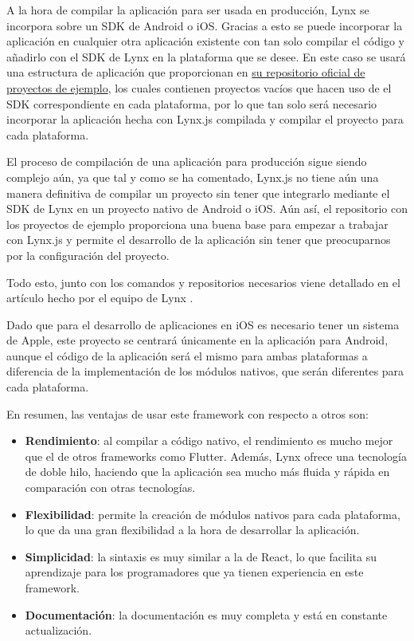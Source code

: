A la hora de compilar la aplicación para ser usada en producción, Lynx se incorpora sobre un SDK de Android o iOS. Gracias a esto se puede incorporar la aplicación en cualquier otra aplicación existente con tan solo compilar el código y añadirlo con el SDK de Lynx en la plataforma que se desee.
En este caso se usará una estructura de aplicación que proporcionan en \href{https://github.com/lynx-family/integrating-lynx-demo-projects}{su repositorio oficial de proyectos de ejemplo}, los cuales contienen proyectos vacíos que hacen uso de el SDK correspondiente en cada plataforma, por lo que tan solo será necesario incorporar la aplicación hecha con Lynx.js compilada y compilar el proyecto para cada plataforma.

El proceso de compilación de una aplicación para producción sigue siendo complejo aún, ya que tal y como se ha comentado, Lynx.js no tiene aún una manera definitiva de compilar un proyecto sin tener que integrarlo mediante el SDK de Lynx en un proyecto nativo de Android o iOS. Aún así, el repositorio con los proyectos de ejemplo proporciona una buena base para empezar a trabajar con Lynx.js y permite el desarrollo de la aplicación sin tener que preocuparnos por la configuración del proyecto.

Todo esto, junto con los comandos y repositorios necesarios viene detallado en el artículo hecho por el equipo de Lynx \parencite{lynx-native-modules}.

Dado que para el desarrollo de aplicaciones en iOS es necesario tener un sistema de Apple, este proyecto se centrará únicamente en la aplicación para Android, aunque el código de la aplicación será el mismo para ambas plataformas a diferencia de la implementación de los módulos nativos, que serán diferentes para cada plataforma.

En resumen, las ventajas de usar este framework con respecto a otros son:
\begin{itemize}
    \item \textbf{Rendimiento}: al compilar a código nativo, el rendimiento es mucho mejor que el de otros frameworks como Flutter. Además, Lynx ofrece una tecnología de doble hilo, haciendo que la aplicación sea mucho más fluida y rápida en comparación con otras tecnologías.
    \item \textbf{Flexibilidad}: permite la creación de módulos nativos para cada plataforma, lo que da una gran flexibilidad a la hora de desarrollar la aplicación.
    \item \textbf{Simplicidad}: la sintaxis es muy similar a la de React, lo que facilita su aprendizaje para los programadores que ya tienen experiencia en este framework.
    \item \textbf{Documentación}: la documentación es muy completa y está en constante actualización.
\end{itemize}


